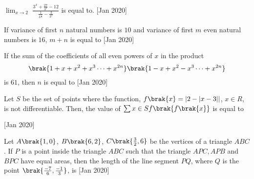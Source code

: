 \iffalse
\title{Assignment}
\author{ee24btech11064}
\section{integer}
\fi

\item $\lim_{x\to2}$ $\frac{3^x+\frac{27}{3^x}-12}{\frac{1}{3^\frac{x}{2}}-\frac{3}{3^x}}$ is equal to.
\hfill[Jan 2020]
\item If variance of first $n$ natural numbers is $10$ and variance of first $m$ even natural numbers is $16$, $m + n$ is equal to
\hfill[Jan 2020]
\item  If the sum of the coefficients of all even powers of $x$ in the product
\begin{align*}
    \brak{1+x+x^2+x^3\cdots+x^{2n}}\brak{1-x+x^2-x^3\cdots+x^{2n}}
\end{align*}
is $61$, then $n$ is equal to \hfill[Jan 2020]
\item Let $S$ be the set of points where the function, $f\brak{x}=|2-|x-3||$, $x \in R$, is not differentiable. Then, the value of $\sum x \in S f\brak{f\brak{x}}$ is equal to
 \hfill[Jan 2020]
\item Let $A\brak{1,0}$, $B\brak{6,2}$, $C\brak{\frac{3}{2},6}$ be the vertices of a triangle $ABC$. If $P$ is a point inside the triangle $ABC$ such that the triangle $APC,APB$ and $BPC$ have equal areas, then the length of the line segment $PQ$, where $Q$ is the point $\brak{\frac{-7}{6},\frac{-1}{3}}$, is \hfill[Jan 2020] 
